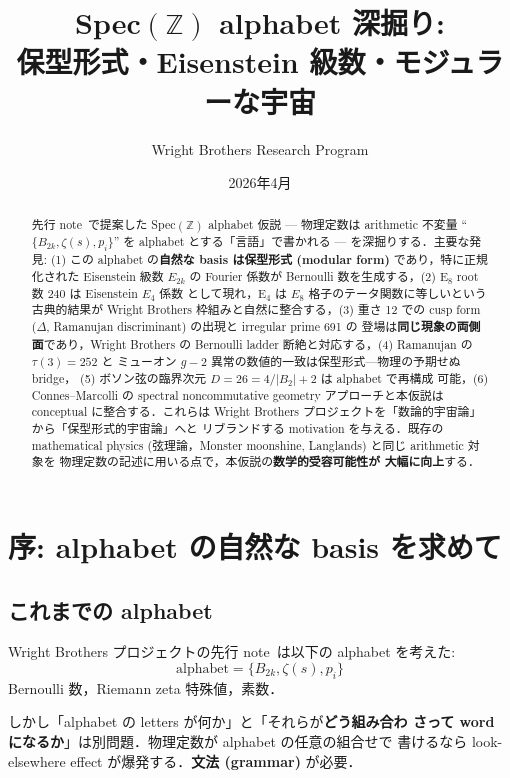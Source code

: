 \documentclass[11pt,a4paper]{article}
\title{Spec$(\mathbb{Z})$ alphabet 深掘り:\\
保型形式・Eisenstein 級数・モジュラーな宇宙}
\author{Wright Brothers Research Program}
\date{2026年4月}
\begin{document}
\maketitle

\begin{abstract}
先行 note~\cite{b2-deeper}で提案した Spec$(\mathbb{Z})$ alphabet
仮説 — 物理定数は arithmetic 不変量 ``$\{B_{2k}, \zeta(s), p_i\}$''
を alphabet とする「言語」で書かれる — を深掘りする．主要な発見:
(1) この alphabet の\textbf{自然な basis は保型形式 (modular form)}
であり，特に正規化された Eisenstein 級数 $E_{2k}$ の Fourier 係数が
Bernoulli 数を生成する，(2) E$_8$ root 数 $240$ は Eisenstein $E_4$ 係数
として現れ，E$_4$ は $E_8$ 格子のテータ関数に等しいという古典的結果が
Wright Brothers 枠組みと自然に整合する，(3) 重さ 12 での cusp form
($\Delta$, Ramanujan discriminant) の出現と irregular prime 691 の
登場は\textbf{同じ現象の両側面}であり，Wright Brothers の Bernoulli
ladder 断絶と対応する，(4) Ramanujan の $\tau(3) = 252$ と
ミューオン $g-2$ 異常の数値的一致は保型形式—物理の予期せぬ bridge，
(5) ボソン弦の臨界次元 $D = 26 = 4/|B_2| + 2$ は alphabet で再構成
可能，(6) Connes--Marcolli の spectral noncommutative geometry
アプローチと本仮説は conceptual に整合する．これらは Wright Brothers
プロジェクトを「数論的宇宙論」から「保型形式的宇宙論」へと
リブランドする motivation を与える．既存の mathematical physics
(弦理論，Monster moonshine, Langlands) と同じ arithmetic 対象を
物理定数の記述に用いる点で，本仮説の\textbf{数学的受容可能性が
大幅に向上}する．
\end{abstract}

\tableofcontents

\newpage
\section{序: alphabet の自然な basis を求めて}

\subsection{これまでの alphabet}

Wright Brothers プロジェクトの先行 note~\cite{b2-deeper}は以下の
alphabet を考えた:
\begin{equation}
\text{alphabet} = \{B_{2k}, \zeta(s), p_i\}
\end{equation}
Bernoulli 数，Riemann zeta 特殊値，素数．

しかし「alphabet の letters が何か」と「それらが\textbf{どう組み合わ
さって word になるか}」は別問題．物理定数が alphabet の任意の組合せで
書けるなら look-elsewhere effect が爆発する．\textbf{文法 (grammar)}
が必要．
\end{document}
